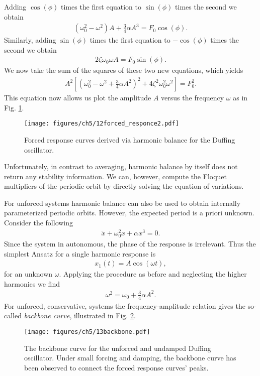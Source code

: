 Adding $\cos(\phi)$ times the first equation to $\sin(\phi)$ times the second we obtain
\begin{align}
	\left( \omega _0^2 - \omega^2 \right) A + \frac{3}{4} \alpha A^3 = F_0 \cos (\phi).
\end{align}
Similarly, adding $\sin(\phi)$ times the first equation to $-\cos(\phi)$ times the second we obtain
\begin{align}
	2 \zeta \omega_0 \omega A = F_0 \sin (\phi).
\end{align}
We now take the sum of the squares of these two new equations, which yields
\begin{align}
	A^2 \left[ \left( \omega _0^2 - \omega ^2 + \frac{3}{4} \alpha A^2 \right) ^2 + 4 \zeta^2 \omega_0^2 \omega ^2 \right] = F_0^2.
\end{align}
This equation now allows us plot the amplitude $A$ versus the frequency $\omega$ as in Fig. \ref{fig:forced_response2}.
\begin{figure}[h!]
	\centering
	\texttt{[image: figures/ch5/12forced\_responce2.pdf]}
	\caption{Forced response curves derived via harmonic balance for the Duffing oscillator.}
	\label{fig:forced_response2}
\end{figure}

Unfortunately, in contrast to averaging, harmonic balance by itself does not return any stability information. We can, however, compute the Floquet multipliers of the periodic orbit by directly solving the equation of variations. 

\begin{ex}
	For unforced systems harmonic balance can also be used to obtain internally parameterized periodic orbits. However, the expected period is a priori unknown. Consider the following
	\begin{align}
		 \ddot{x} + \omega _0^2 x + \alpha x^3 = 0.
	\end{align}
	Since the system in autonomous, the phase of the response is irrelevant. Thus the simplest Ansatz for a single harmonic response is
	\begin{align}
		x_1(t) = A \cos (\omega t),
	\end{align}
	for an unknown $\omega $. Applying the procedure as before and neglecting the higher harmonics we find
	\begin{align}
		\omega^2 = \omega_0 + \frac{3}{4} \alpha A^2.
	\end{align}
	For unforced, conservative, systems the frequency-amplitude relation gives the so-called \emph{backbone curve}, illustrated in Fig. \ref{fig:backbone}.
\begin{figure}[h!]
	\centering
	\texttt{[image: figures/ch5/13backbone.pdf]}
	\caption{The backbone curve for the unforced and undamped Duffing oscillator. Under small forcing and damping, the backbone curve has been observed to connect the forced response curves' peaks.}
	\label{fig:backbone}
\end{figure}
\end{ex}
